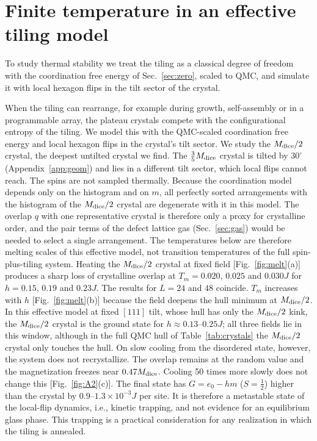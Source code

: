 \documentclass[prb,twocolumn,amsmath,amssymb,floatfix]{revtex4-2}
\newcommand{\Md}{M_{\rm dice}}
\begin{document}
\section{Finite temperature in an effective tiling model}\label{app:finiteT}

To study thermal stability we treat the tiling as a classical degree of freedom with the coordination free energy of Sec.~\ref{sec:zero}, scaled to QMC, and simulate it with local hexagon flips in the tilt sector of the crystal.



When the tiling can rearrange, for example during growth, self-assembly or in a programmable array, the plateau crystals compete with the configurational entropy of the tiling. We model this with the QMC-scaled coordination free energy and local hexagon flips in the crystal's tilt sector. We study the $\Md/2$ crystal, the deepest untilted crystal we find. The $\frac35\Md$ crystal is tilted by $30^\circ$ (Appendix~\ref{app:geom}) and lies in a different tilt sector, which local flips cannot reach. The spins are not sampled thermally. Because the coordination model depends only on the histogram and on $m$, all perfectly sorted arrangements with the histogram of the $\Md/2$ crystal are degenerate with it in this model. The overlap $q$ with one representative crystal is therefore only a proxy for crystalline order, and the pair terms of the defect lattice gas (Sec.~\ref{sec:gas}) would be needed to select a single arrangement. The temperatures below are therefore melting scales of this effective model, not transition temperatures of the full spin-plus-tiling system. Heating the $\Md/2$ crystal at fixed field [Fig.~\ref{fig:melt}(a)] produces a sharp loss of crystalline overlap at $T_m=0.020$, $0.025$ and $0.030J$ for $h=0.15$, $0.19$ and $0.23J$. The results for $L=24$ and $48$ coincide. $T_m$ increases with $h$ [Fig.~\ref{fig:melt}(b)] because the field deepens the hull minimum at $\Md/2$. In this effective model at fixed $[111]$ tilt, whose hull has only the $\Md/2$ kink, the $\Md/2$ crystal is the ground state for $h\approx0.13$--$0.25J$; all three fields lie in this window, although in the full QMC hull of Table~\ref{tab:crystals} the $\Md/2$ crystal only touches the hull. On slow cooling from the disordered state, however, the system does not recrystallize. The overlap remains at the random value and the magnetization freezes near $0.47\Md$. Cooling 50 times more slowly does not change this [Fig.~\ref{fig:A2}(c)]. The final state has $G=e_0-hm$ ($S=\frac12$) higher than the crystal by $0.9$--$1.3\times10^{-3}J$ per site. It is therefore a metastable state of the local-flip dynamics, i.e., kinetic trapping, and not evidence for an equilibrium glass phase. This trapping is a practical consideration for any realization in which the tiling is annealed.
\end{document}
